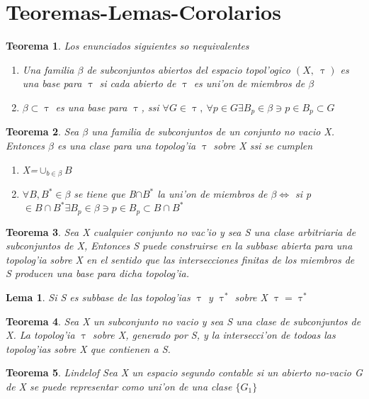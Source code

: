 \documentclass{article}
\newtheorem{theorem}{Teorema}
\newtheorem{lemma}{Lema}
\begin{document}
\section{Teoremas-Lemas-Corolarios}
\begin{theorem}
	Los enunciados siguientes so nequivalentes
	\begin{enumerate}
		\item Una familia $\beta$ de subconjuntos abiertos del espacio topol'ogico $(X,\ \uptau)$ es una base para $\uptau$ si cada abierto de $\uptau$ es uni'on de miembros de $\beta$
		\item $\beta\subset\uptau$ es una base para $\uptau$, ssi $\forall G\in \uptau,\ \forall p\in G \exists B_p\in\beta\ni p\in B_p\subset G$ 
	\end{enumerate}
\end{theorem}
\begin{theorem}
	 Sea $\beta$ una familia de subconjuntos de un conjunto no vacio X. Entonces $\beta$ es una clase para una topolog'ia $\uptau$ sobre X ssi se cumplen 
	 \begin{enumerate}
	 \item X=$\cup_{b\in\beta} B$
	 \item $\forall B, B^*\in\beta$ se tiene que B$\cap B^*$ la uni'on de miembros de $\beta \Leftrightarrow$ si p$\in B\cap B^*\exists B_p\in\beta\ni p\in B_p\subset B\cap B^*$ 
	 \end{enumerate}
\end{theorem}
\begin{theorem}
	Sea X cualquier conjunto no vac'io y sea S una clase arbitriaria de subconjuntos de X, Entonces S puede construirse en la subbase abierta para una topolog'ia sobre X en el sentido que las intersecciones finitas de los miembros de S producen una base para dicha topolog'ia.
\end{theorem}
\begin{lemma}
Si S es subbase de las topolog'ias $\uptau$ y $\uptau^*$  sobre X $\uptau = \uptau^*$
\end{lemma}
\begin{theorem}
Sea X un subconjunto no vacio y sea S una clase de subconjuntos de X. La topolog'ia $\uptau$ sobre X, generado por S, y la intersecci'on de todoas las topolog'ias sobre X que contienen a S. 
\end{theorem}
\begin{theorem}{Lindelof}
	Sea X un espacio segundo contable si un abierto no-vacio G de X se puede representar como uni'on de una clase $\{G_1\}$

\end{theorem}







\end{document}

